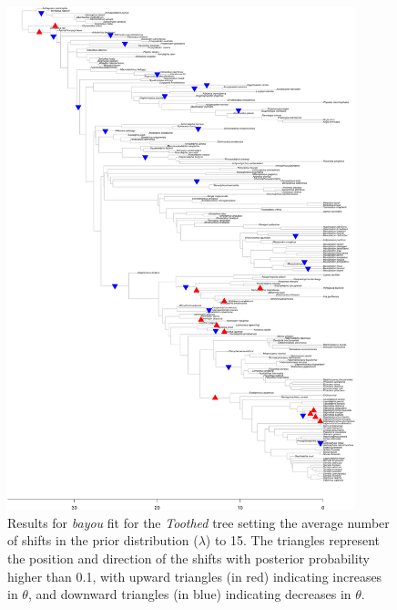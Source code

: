 \begin{figure}[H]
\includegraphics[width=0.9\textwidth]{img/plots-toothed-wZBL-k15-1.pdf}
\caption{Results for \textit{bayou} fit for the \textit{Toothed} tree setting the average number of shifts in the prior distribution ($\lambda$) to 15. The triangles represent the position and direction of the shifts with posterior probability higher than 0.1, with upward triangles (in red) indicating increases in $\theta$, and downward triangles (in blue) indicating decreases in $\theta$.}
\label{fig:toothed-k15}
\end{figure}

\newpage

